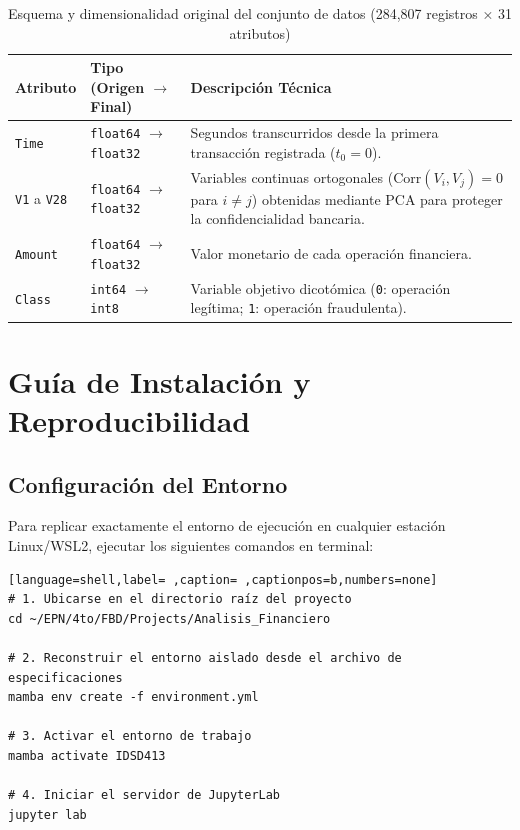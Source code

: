 \documentclass[11pt]{article}
\begin{document}
\begin{table}[H]
\caption{\label{tab:orgdc10f43}Esquema y dimensionalidad original del conjunto de datos (284,807 registros × 31 atributos)}
\centering
\begin{tabular}{p{} p{} p{}}
\toprule
Atributo & Tipo (Origen \(\to\) Final) & Descripción Técnica\\[0pt]
\midrule
\texttt{Time} & \texttt{float64} \(\to\) \texttt{float32} & Segundos transcurridos desde la primera transacción registrada (\(t_0 = 0\)).\\[0pt]
\texttt{V1} a \texttt{V28} & \texttt{float64} \(\to\) \texttt{float32} & Variables continuas ortogonales (\(\text{Corr}(V_i, V_j) = 0\) para \(i \neq j\)) obtenidas mediante PCA para proteger la confidencialidad bancaria.\\[0pt]
\texttt{Amount} & \texttt{float64} \(\to\) \texttt{float32} & Valor monetario de cada operación financiera.\\[0pt]
\texttt{Class} & \texttt{int64} \(\to\) \texttt{int8} & Variable objetivo dicotómica (\texttt{0}: operación legítima; \texttt{1}: operación fraudulenta).\\[0pt]
\bottomrule
\end{tabular}
\end{table}

\section{Guía de Instalación y Reproducibilidad}
\label{sec:org894fa98}

\subsection{Configuración del Entorno}
\label{sec:org761f3c7}

Para replicar exactamente el entorno de ejecución en cualquier estación Linux/WSL2, ejecutar los siguientes comandos en terminal:

\begin{lstlisting}[language=shell,label= ,caption= ,captionpos=b,numbers=none]
# 1. Ubicarse en el directorio raíz del proyecto
cd ~/EPN/4to/FBD/Projects/Analisis_Financiero

# 2. Reconstruir el entorno aislado desde el archivo de especificaciones
mamba env create -f environment.yml

# 3. Activar el entorno de trabajo
mamba activate IDSD413

# 4. Iniciar el servidor de JupyterLab
jupyter lab
\end{lstlisting}
\end{document}
